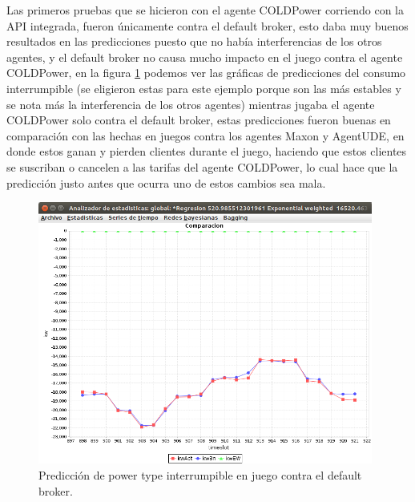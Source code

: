 Las primeros pruebas que se hicieron con el agente COLDPower corriendo con la API integrada, fueron únicamente contra el default broker, esto daba muy buenos resultados en las predicciones puesto que no había interferencias de los otros agentes, y el default broker no causa  mucho impacto en el juego contra el agente COLDPower, en la figura \ref{fig:errorGlobalInterrumpible1agente} podemos ver las gráficas de predicciones del consumo interrumpible (se eligieron estas para este ejemplo porque son las más estables y se nota más la interferencia de los otros agentes) mientras jugaba el agente COLDPower solo contra el default broker, estas predicciones fueron buenas en comparación con las hechas en juegos contra los agentes Maxon y AgentUDE, en donde estos ganan y pierden clientes durante el juego, haciendo que estos clientes se suscriban o cancelen a las tarifas del agente COLDPower, lo cual hace que la predicción justo antes que ocurra uno de estos cambios sea mala.

\begin{figure}[h]
	\centering
	\includegraphics[width=11cm]{img/errorGlobalInterrumpible1agente.png}
	\caption{Predicción de power type interrumpible en juego contra el default broker.}
	\label{fig:errorGlobalInterrumpible1agente}
\end{figure}

